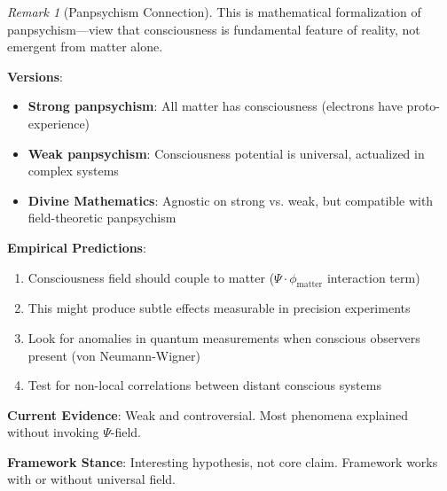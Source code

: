 \documentclass[11pt,a4paper]{article}
\theoremstyle{definition}
\theoremstyle{remark}
\newtheorem{remark}{Remark}[section]
\begin{document}
\begin{enumerate}
\begin{remark}[Panpsychism Connection]
This is mathematical formalization of panpsychism—view that consciousness is fundamental feature of reality, not emergent from matter alone.

\textbf{Versions}:
\begin{itemize}
    \item \textbf{Strong panpsychism}: All matter has consciousness (electrons have proto-experience)
    \item \textbf{Weak panpsychism}: Consciousness potential is universal, actualized in complex systems
    \item \textbf{Divine Mathematics}: Agnostic on strong vs. weak, but compatible with field-theoretic panpsychism
\end{itemize}

\textbf{Empirical Predictions}:
\begin{enumerate}
    \item Consciousness field should couple to matter (\(\Psi \cdot \phi_{\text{matter}}\) interaction term)
    \item This might produce subtle effects measurable in precision experiments
    \item Look for anomalies in quantum measurements when conscious observers present (von Neumann-Wigner)
    \item Test for non-local correlations between distant conscious systems
\end{enumerate}

\textbf{Current Evidence}: Weak and controversial. Most phenomena explained without invoking \(\Psi\)-field.

\textbf{Framework Stance}: Interesting hypothesis, not core claim. Framework works with or without universal field.
\end{remark}

\begin{figure}[H]
\centering
{}
\end{figure}
\end{enumerate}
\end{document}
